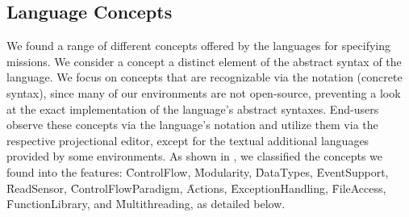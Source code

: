 \subsection{Language Concepts}\label{sec:langconcepts}

\newcommand{\fcontrolflow}{\f{ControlFlow}}
\newcommand{\fmodularity}{\f{Modularity}}
\newcommand{\fdatatypes}{\f{DataTypes}}
\newcommand{\fevents}{\f{EventSupport}}
\newcommand{\freadsensor}{\f{ReadSensor}}
\newcommand{\fcontrolflowparadigm}{\f{ControlFlowParadigm}}
\newcommand{\factions}{\f{Actions}}
\newcommand{\fexceptions}{\f{ExceptionHandling}}
\newcommand{\ffileaccess}{\f{FileAccess}}
\newcommand{\ffunctionlib}{\f{FunctionLibrary}}
\newcommand{\fmultithread}{\f{Multithreading}}

We found a range of different concepts offered by the languages for specifying missions. We consider a concept a distinct element of the abstract syntax of the language. We focus on concepts that are recognizable via the notation (concrete syntax), since many of our environments are not open-source, preventing a look at the exact implementation of the language's abstract syntaxes. End-users observe these concepts via the language's notation and utilize them via the respective projectional editor, except for the textual additional languages provided by some environments. As shown in , we classified the concepts we found into the features: \fcontrolflow, \fmodularity, \fdatatypes, \fevents, \freadsensor, \fcontrolflowparadigm, \factions, \fexceptions, \ffileaccess, \ffunctionlib, and \fmultithread, as detailed below.



